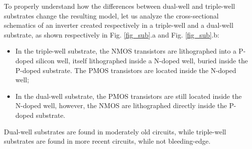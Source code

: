 	To properly understand how the differences between dual-well and triple-well substrates change the resulting model, let us analyze the cross-sectional schematics of an inverter created respectively in a triple-well and a dual-well substrate, as shown respectively in Fig. \ref{fig_sub}.a and Fig. \ref{fig_sub}.b:
	\begin{itemize}
		\item In the triple-well substrate, the NMOS transistors are lithographed into a P-doped silicon well, itself lithographed inside a N-doped well, buried inside the P-doped substrate. The PMOS transistors are located inside the N-doped well;
		\item In the dual-well substrate, the PMOS transistors are still located inside the N-doped well, however, the NMOS are lithographed directly inside the P-doped substrate.
	\end{itemize}
	Dual-well substrates are found in moderately old circuits, while triple-well substrates are found in more recent circuits, while not bleeding-edge.
